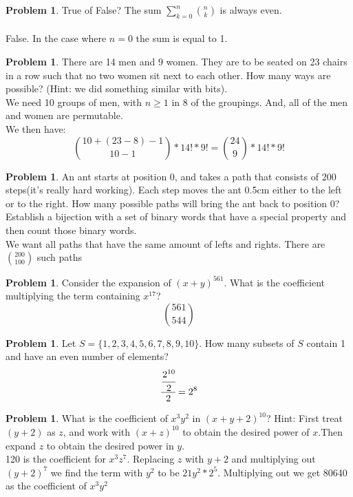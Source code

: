 \documentclass[10pt,leqno ]{article}
\theoremstyle{definition}
\newtheorem{problem}[theorem]{Problem}
\begin{document}
\begin{problem} True of False?  The sum $\sum_{k=0}^{n}{n \choose k}$ is always even.
\\\\
\Large
False.  In the case where $n=0$ the sum is equal to 1.
\end{problem}
\newpage

\begin{problem} There are 14 men and 9 women.  They are to be seated on 23 chairs in a row such that no two women sit next to each other.  How many ways are possible?  (Hint:  we did something similar with bits).
\\
\Large
We need 10 groups of men, with $n \geq 1$ in 8 of the groupings.  And, all of the men and women are permutable.
\\
We then have:
$${ {10 + (23-8) -1} \choose {10-1}}  * 14! * 9! = {24 \choose 9} * 14! * 9! $$
\end{problem}
\newpage

\begin{problem} An ant starts at position 0,  and takes a path that consists of 200 steps(it’s really hard working).  Each step moves the ant 0.5cm either to the left or to the right.  How many possible paths will bring the ant back to position 0?  Establish a bijection with a set of binary words that have a special property and then count those binary words.
\\
\Large
We want all paths that have the same amount of lefts and rights.  There are ${200 \choose 100}$ such paths
\end{problem}
\newpage

\begin{problem} Consider the expansion of $(x+y)^{561}$.  What is the coefficient multiplying the term containing $x^{17}$?
\\
\Large
$${561 \choose 544}$$
\end{problem}
\newpage

\begin{problem} Let $S=\{1,2,3,4,5,6,7,8,9,10\}$.  How many subsets of $S$ contain 1 and have an even number of elements?
\\
\Large
$$\cfrac{\cfrac{2^{10}}{2}}{2} = 2^8$$
\end{problem}
\newpage

\begin{problem} What  is  the  coefficient  of $x^3 y^2$ in  $(x+y+ 2)^{10}$?  Hint:  First  treat $(y+ 2)$ as $z$, and work with $(x+z)^{10}$ to obtain the desired power of $x$.Then expand $z$ to obtain the desired power in $y$.
\\
\Large
120 is the coefficient for $x^3z^7$.  Replacing $z$ with $y+2$ and multiplying out $(y+2)^7$ we find the term with $y^2$ to be $21 y^2 * 2^5$.  Multiplying out we get 80640 as the coefficient of $x^3y^2$ 
\end{problem}
\newpage
\end{document}
